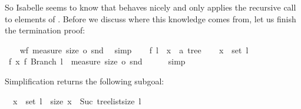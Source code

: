 \begin{isabellebody}
\begin{isamarkuptxt}
  So Isabelle seems to know that  behaves nicely and only
  applies the recursive call  to elements
  of . Before we discuss where this knowledge comes from,
  let us finish the termination proof:%
\end{isamarkuptxt}%
\isamarkuptrue%
\ \ \isamarkupfalse%
\ {\isachardoublequoteopen}wf\ {\isacharparenleft}measure\ {\isacharparenleft}size\ o\ snd{\isacharparenright}{\isacharparenright}{\isachardoublequoteclose}\ \isamarkupfalse%
\ simp\isanewline
{}\isamarkupfalse%
\isanewline
\ \ \isamarkupfalse%
\ f\ l\ \ x\ {\isacharcolon}{\isacharcolon}\ {\isachardoublequoteopen}{\isacharprime}a\ tree{\isachardoublequoteclose}\isanewline
\ \ \isamarkupfalse%
\ {\isachardoublequoteopen}x\ {\isasymin}\ set\ l{\isachardoublequoteclose}\isanewline
\ \ \isamarkupfalse%
\ {\isachardoublequoteopen}{\isacharparenleft}{\isacharparenleft}f{\isacharcomma}\ x{\isacharparenright}{\isacharcomma}\ {\isacharparenleft}f{\isacharcomma}\ Branch\ l{\isacharparenright}{\isacharparenright}\ {\isasymin}\ measure\ {\isacharparenleft}size\ o\ snd{\isacharparenright}{\isachardoublequoteclose}\isanewline
\ \ \ \ \isamarkupfalse%
\ simp%
\begin{isamarkuptxt}%
Simplification returns the following subgoal: 

      \begin{isabelle}%
\ {}{\isachardot}\ x{\isacharunderscore}{\isacharunderscore}\ {\isasymin}\ set\ l{\isacharunderscore}{\isacharunderscore}\ {\isasymLongrightarrow}\ size\ x{\isacharunderscore}{\isacharunderscore}\ {\isacharless}\ Suc\ {\isacharparenleft}tree{\isacharunderscore}list{\isacharunderscore}size\ l{\isacharunderscore}{\isacharunderscore}{\isacharparenright}%
\end{isabelle} 


\end{isamarkuptxt}
\end{isabellebody}
